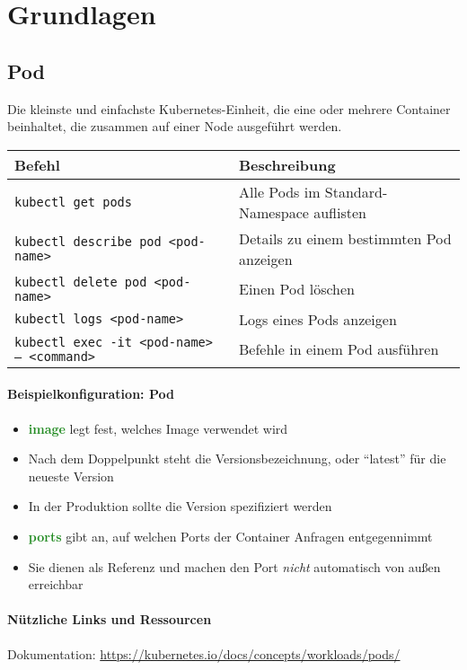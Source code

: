 \chapter{Grundlagen}

\section{Pod}
Die kleinste und einfachste Kubernetes-Einheit, die eine oder mehrere Container beinhaltet, die zusammen auf einer Node ausgeführt werden. \\

\noindent
\begin{tabular}{|p{}|p{}|}
\hline
\textbf{Befehl} & \textbf{Beschreibung} \\
\hline
\texttt{kubectl get pods} & Alle Pods im Standard-Namespace auflisten \\
\texttt{kubectl describe pod <pod-name>} & Details zu einem bestimmten Pod anzeigen \\
\texttt{kubectl delete pod <pod-name>} & Einen Pod löschen \\
\texttt{kubectl logs <pod-name>} & Logs eines Pods anzeigen \\
\texttt{kubectl exec -it <pod-name> -- <command>} & Befehle in einem Pod ausführen \\
\hline
\end{tabular}

\subsubsection{Beispielkonfiguration: Pod}


\begin{itemize}
    \item \textcolor{ForestGreen}{\textbf{image}} legt fest, welches Image verwendet wird
    \item Nach dem Doppelpunkt steht die Versionsbezeichnung, oder \enquote{latest} für die neueste Version
    \item In der Produktion sollte die Version spezifiziert werden
    \item \textcolor{ForestGreen}{\textbf{ports}} gibt an, auf welchen Ports der Container Anfragen entgegennimmt
    \item Sie dienen als Referenz und machen den Port \emph{nicht} automatisch von außen erreichbar
\end{itemize}

\subsubsection{Nützliche Links und Ressourcen}
Dokumentation: \url{https://kubernetes.io/docs/concepts/workloads/pods/}

